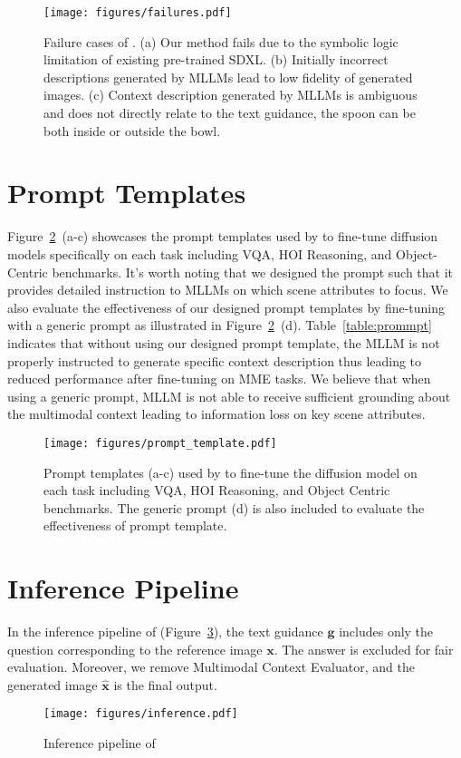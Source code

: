 \begin{figure}[!h]
    \centering
    \texttt{[image: figures/failures.pdf]}
    \caption{Failure cases of \method. (a) Our method fails due to the symbolic logic limitation of existing pre-trained SDXL. (b) Initially incorrect descriptions generated by MLLMs lead to low fidelity of generated images. (c) Context description generated by MLLMs is ambiguous and does not directly relate to the text guidance, the spoon can be both inside or outside the bowl.}
    \label{fig:failure}
\end{figure}

\section{Prompt Templates}
\label{appendix:prompts}
Figure~\ref{fig:prompt_templates}~(a-c) showcases the prompt templates used by \method to fine-tune diffusion models specifically on each task including VQA, HOI Reasoning, and Object-Centric benchmarks. It's worth noting that we designed the prompt such that it provides detailed instruction to MLLMs on which scene attributes to focus. We also evaluate the effectiveness of our designed prompt templates by fine-tuning \method with a generic prompt as illustrated in Figure~\ref{fig:prompt_templates}~(d). Table~\ref{table:prommpt} indicates that without using our designed prompt template, the MLLM is not properly instructed to generate specific context description thus leading to reduced performance after fine-tuning on MME tasks. We believe that when using a generic prompt, MLLM is not able to receive sufficient grounding about the multimodal context leading to information loss on key scene attributes.

\begin{figure}[!h]
    \centering
    \texttt{[image: figures/prompt\_template.pdf]}
    \caption{Prompt templates (a-c) used by \method to fine-tune the diffusion model on each task including VQA, HOI Reasoning, and Object Centric benchmarks. The generic prompt (d) is also included to evaluate the effectiveness of prompt template.}
    \label{fig:prompt_templates}
\end{figure}
\section{Inference Pipeline}
\label{appendix:inference}
In the inference pipeline of \method (Figure~\ref{fig:inference}), the text guidance $\mathbf{g}$ includes only the question corresponding to the reference image $\mathbf{x}$. The answer is excluded for fair evaluation. Moreover, we remove Multimodal Context Evaluator, and the generated image $\hat{\mathbf{x}}$ is the final output.
\begin{figure}[!h]
    \centering
    \texttt{[image: figures/inference.pdf]}
    \caption{Inference pipeline of \method}
    \label{fig:inference}
\end{figure}

